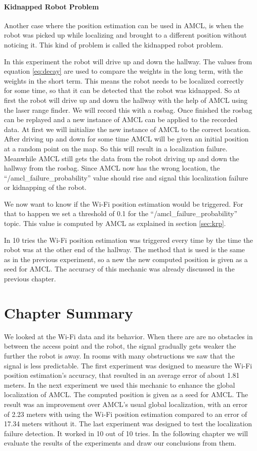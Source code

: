 \paragraph{Kidnapped Robot Problem}
Another case where the position estimation can be used in AMCL, is when the robot was picked up while localizing and brought to a different position without noticing it. This kind of problem is called the kidnapped robot problem. 

In this experiment the robot will drive up and down the hallway. The values from equation \ref{eq:decay} are used to compare the weights in the long term, with the weights in the short term. This means the robot needs to be localized correctly for some time, so that it can be detected that the robot was kidnapped. So at first the robot will drive up and down the hallway with the help of AMCL using the laser range finder. We will record this with a rosbag. Once finished the rosbag can be replayed and a new instance of AMCL can be applied to the recorded data. At first we will initialize the new instance of AMCL to the correct location. After driving up and down for some time AMCL will be given an initial position at a random point on the map. So this will result in a localization failure. Meanwhile AMCL still gets the data from the robot driving up and down the hallway from the rosbag. Since AMCL now has the wrong location, the ``/amcl\_failure\_probability'' value should rise and signal this localization failure or kidnapping of the robot. 

We now want to know if the Wi-Fi position estimation would be triggered. For that to happen we set a threshold of 0.1 for the ``/amcl\_failure\_probability'' topic. This value is computed by AMCL as explained in section \ref{sec:krp}. 

In 10 tries the Wi-Fi position estimation was triggered every time by the time the robot was at the other end of the hallway. The method that is used is the same as in the previous experiment, so a new the new computed position is given as a seed for AMCL. The accuracy of this mechanic was already discussed in the previous chapter. 	
\section{Chapter Summary}
We looked at the Wi-Fi data and its behavior. When there are are no obstacles in between the access point and the robot, the signal gradually gets weaker the further the robot is away. In rooms with many obstructions we saw that the signal is less predictable. 
The first experiment was designed to measure the Wi-Fi position estimation's accuracy, that resulted in an average error of about 1.81 meters. In the next experiment we used this mechanic to enhance the global localization of AMCL. The computed position is given as a seed for AMCL. The result was an improvement over AMCL's usual global localization, with an error of 2.23 meters with using the Wi-Fi position estimation compared to an error of 17.34 meters without it.
The last experiment was designed to test the localization failure detection. It worked in 10 out of 10 tries. 
In the following chapter we will evaluate the results of the experiments and draw our conclusions from them.